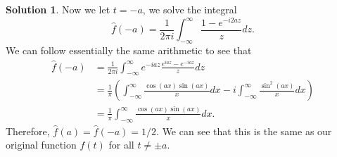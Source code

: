 \documentclass[12pt]{article}
\theoremstyle{definition}
\newtheorem{sol}{Solution}
\theoremstyle{remark}
\begin{document}
\begin{sol}
  Now we let $t=-a$, we solve the integral
\begin{equation}
   \hat f(-a) = \frac{1}{2\pi i} \int_{-\infty}^{\infty} \frac{1 - e^{-i2az}}{z} dz.    
\end{equation}
We can follow essentially the same arithmetic to see that
\begin{align}
   \hat f(-a) &= \frac{1}{2\pi i} \int_{-\infty}^{\infty} e^{-iaz}\frac{e^{iaz} - e^{-iaz}}{z} dz\\
          &= \frac{1}{\pi}  \left(\int_{-\infty}^{\infty} \frac{\cos(ax)\sin(ax)}{x}dx - i \int_{-\infty}^{\infty} \frac{\sin^2(ax)}{x}dx \right)\\
          &= \frac{1}{\pi} \int_{-\infty}^{\infty} \frac{\cos(ax)\sin(ax)}{x}dx.
\end{align}
Therefore, $\hat f(a) = \hat f(-a) = 1/2$. We can see that this is the same as our original function $f(t)$ for all $t\neq \pm a$.
\end{sol}

\end{document}
